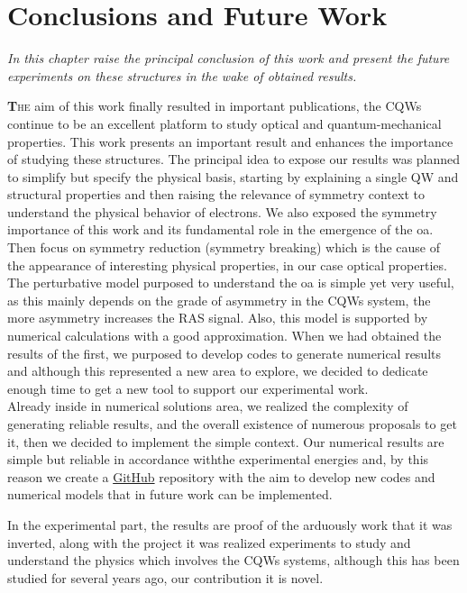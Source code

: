 \chapter{Conclusions and Future Work }
\label{chap:Intro}
\textit{In this chapter raise the principal conclusion of this work and present the future experiments on these structures in the wake of obtained results.}
\vfill
\minitoc
\newpage
\allowdisplaybreaks


\lettrine[lines=3, lraise=.1, nindent=0mm, slope=0mm]{\textbf{T}}{he} aim of this work finally resulted in important publications, the CQWs continue to be an excellent platform to study optical and quantum-mechanical properties.
This work presents an important result and enhances the importance of studying these structures. The principal idea to expose our results was planned to simplify but specify the physical basis, starting by explaining a single QW and structural properties and then raising the relevance of symmetry context to understand the physical behavior of electrons.
We also exposed the symmetry importance of this work and its fundamental role in
the emergence of the \gls{oa}. Then focus on symmetry reduction (symmetry breaking) which is the cause of the appearance of interesting physical properties, in our case optical properties.
The perturbative model purposed to understand the \gls{oa} is simple yet very useful, as this mainly depends on the grade of asymmetry in the CQWs system, the more asymmetry increases the RAS signal. Also, this model is supported by numerical calculations with a good approximation. When we had obtained the results of the first, we purposed to develop codes to generate numerical results and although this represented a new area to explore, we decided to dedicate enough time to get a new tool to support our experimental work.\\
Already inside in numerical solutions area, we realized the complexity of generating reliable
results, and the overall existence of numerous proposals to get it, then we decided to implement the simple context. Our numerical results are simple but reliable in accordance withthe experimental energies and, by this reason we create a  \href{https://github.com/lflmgroup}{GitHub} repository \cite{lflmgroup} with the aim to develop new codes and numerical models that in future work can be implemented.

In the experimental part, the results are proof of the arduously work that it was inverted, along with the project it was realized experiments to study and understand the physics which involves the CQWs systems, although this has been studied for several years ago, our contribution it is novel.

